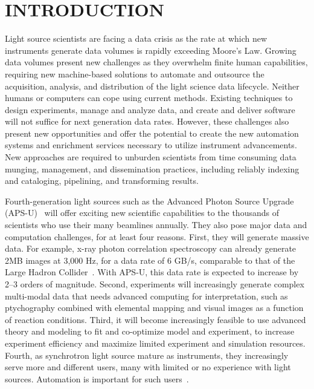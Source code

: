 \documentclass{aip-cp}
\newcommand\ryan[1]{}
\newcommand\ryan[1]{{\color{green}[Ryan: #1]}}
\begin{document}
\section{INTRODUCTION}

\ryan{Proposed new structure to follow the talk: Introduction, history/background, automation and 
outsourcing (high level motivation), acquisition and distribution (dmagic/petrel), publication and 
discovery (mdf/search), automation (automate, TAP), transformation and analysis (dlhub).}

Light source scientists are facing a data crisis as the rate at which new instruments generate data 
volumes is rapidly exceeding Moore's Law. Growing data 
volumes present new challenges as they overwhelm finite human capabilities, requiring new 
machine-based solutions to automate and outsource the acquisition, analysis, and 
distribution of the 
light science data lifecycle. Neither humans or computers can cope using current methods. Existing 
techniques to design experiments, manage and analyze data, and create and 
deliver software will not suffice for next generation data rates. However, these 
challenges also present new opportunities and offer the potential to create the new automation 
systems and enrichment services necessary to utilize instrument advancements. New 
approaches are required to unburden scientists from time consuming data munging, management, 
and dissemination practices, including reliably indexing and cataloging, pipelining, and 
transforming results.

Fourth-generation light sources such as the Advanced Photon Source Upgrade (APS-U)~\cite{APSU} will offer exciting new
scientific capabilities to the thousands of scientists who use their many beamlines annually.
They also pose major data and computation challenges, for at least four reasons.
First, they will generate massive data. 
For example, x-ray photon correlation spectroscopy can already generate 2MB images at 3,000 Hz,
for a data rate of 6 GB/s, comparable to that of the Large Hadron Collider~\cite{lhcrate}.
With APS-U, this data rate is expected to increase by 2--3 orders of magnitude.
Second, experiments will increasingly generate complex multi-modal data that needs advanced computing
for interpretation, such as ptychography combined with 
elemental mapping and visual images as a function of reaction conditions.
Third, it will become increasingly feasible to use advanced theory and modeling to fit and co-optimize 
model and experiment, to increase experiment efficiency and maximize limited experiment and 
simulation resources.
Fourth, as synchrotron light source mature as instruments, they increasingly serve more and 
different users,
many with limited or no experience with light sources. 
Automation is important for such users~\cite{hiraki2008high,toby2009management}.
\end{document}
